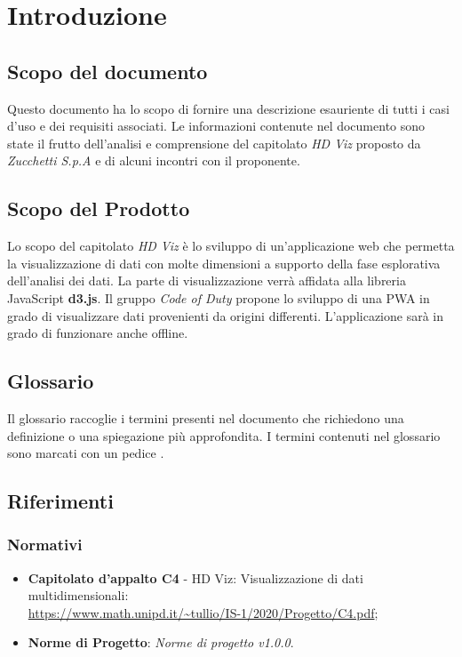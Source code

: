 \section{Introduzione}
    \subsection{Scopo del documento}
    Questo documento ha lo scopo di fornire una descrizione esauriente di tutti i casi d'uso e dei requisiti associati. Le informazioni contenute nel documento sono state il frutto dell'analisi e comprensione del capitolato \emph{HD Viz} proposto da \emph{Zucchetti S.p.A} e di alcuni incontri con il proponente.
    \subsection{Scopo del Prodotto}
    Lo scopo del capitolato \emph{HD Viz} è lo sviluppo di un'applicazione web che permetta la visualizzazione di dati con molte dimensioni a supporto della fase esplorativa dell'analisi dei dati. La parte di visualizzazione verrà affidata alla libreria JavaScript \textbf{d3.js}. Il gruppo \emph{Code of Duty} propone lo sviluppo di una PWA in grado di visualizzare dati provenienti da origini differenti. L'applicazione sarà in grado di funzionare anche offline.
    \subsection{Glossario}
    Il glossario raccoglie i termini presenti nel documento che richiedono una definizione o una spiegazione più approfondita. I termini contenuti nel glossario sono marcati con un pedice \glo{}.
    \subsection{Riferimenti}
    \subsubsection{Normativi}
    \begin{itemize}
        \item \textbf{Capitolato d'appalto C4} - HD Viz: Visualizzazione di dati multidimensionali:\\\url{https://www.math.unipd.it/~tullio/IS-1/2020/Progetto/C4.pdf};
        \item \textbf{Norme di Progetto}: \emph{Norme di progetto v1.0.0}.
    \end{itemize}
